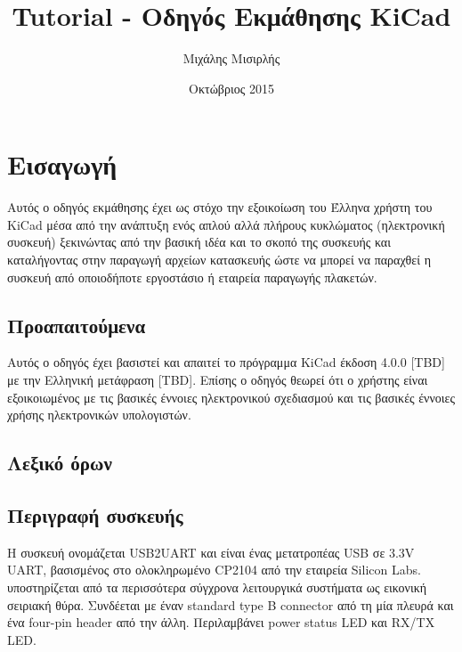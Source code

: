 \documentclass[a4paper]{article}
\title{Tutorial - Οδηγός Εκμάθησης KiCad}
\author{Μιχάλης Μισιρλής}
\date{Οκτώβριος 2015}
\begin{document}
\maketitle

\section{Εισαγωγή}
Αυτός ο οδηγός εκμάθησης έχει ως στόχο την εξοικοίωση του Έλληνα χρήστη του KiCad μέσα από την ανάπτυξη ενός απλού αλλά πλήρους κυκλώματος (ηλεκτρονική συσκευή) ξεκινώντας από την βασική ιδέα και το σκοπό της συσκευής και καταλήγοντας στην παραγωγή αρχείων κατασκευής ώστε να μπορεί να παραχθεί η συσκευή από οποιοδήποτε εργοστάσιο ή εταιρεία παραγωγής πλακετών.

\subsection{Προαπαιτούμενα}
Αυτός ο οδηγός έχει βασιστεί και απαιτεί το πρόγραμμα KiCad έκδοση 4.0.0 [TBD] με την Ελληνική μετάφραση [TBD]. Επίσης ο οδηγός θεωρεί ότι ο χρήστης είναι εξοικοιωμένος με τις βασικές έννοιες ηλεκτρονικού σχεδιασμού και τις βασικές έννοιες χρήσης ηλεκτρονικών υπολογιστών.

\subsection{Λεξικό όρων}

\subsection{Περιγραφή συσκευής}
Η συσκευή ονομάζεται USB2UART και είναι ένας μετατροπέας USB σε 3.3V UART, βασισμένος στο ολοκληρωμένο CP2104 από την εταιρεία Silicon Labs. υποστηρίζεται από τα περισσότερα σύγχρονα λειτουργικά συστήματα ως εικονική σειριακή θύρα. Συνδέεται με έναν standard type B connector από τη μία πλευρά και ένα four-pin header από την άλλη. Περιλαμβάνει power status LED και RX/TX LED.
\end{document}
